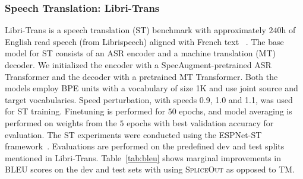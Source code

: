 \documentclass{article}
\newcommand{\SpA}{{\textsc{SpliceOut}}\xspace}
\begin{document}
\subsubsection{Speech Translation: Libri-Trans}
Libri-Trans is a speech translation (ST) benchmark with approximately $240$h of English read speech (from Librispeech) aligned with French text ~\citep{libritrans}. The base model for ST consists of an ASR encoder and a machine translation (MT) decoder. We initialized the encoder with a SpecAugment-pretrained ASR Transformer and the decoder with a pretrained MT Transformer. Both the models employ BPE units with a vocabulary of size 1K and use joint source and target vocabularies. Speed perturbation, with speeds 0.9, 1.0 and 1.1, was used for ST training.  Finetuning is performed for $50$ epochs, and model averaging is performed on weights from the $5$ epochs with best validation accuracy for evaluation. The ST experiments were conducted using the ESPNet-ST framework~\citep{espnetst}. Evaluations are performed on the predefined dev and test splits mentioned in Libri-Trans. Table~\ref{tab:bleu} shows marginal improvements in BLEU scores on the dev and test sets with using \SpA as opposed to TM. 
 
\end{document}
